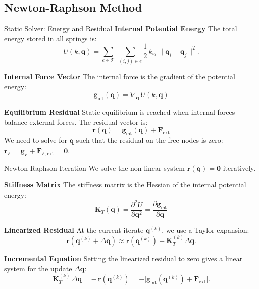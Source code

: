 \documentclass{beamer}
\begin{document}
\subsection{Newton-Raphson Method}

\begin{frame}[fragile]{Static Solver: Energy and Residual}
    \textbf{Internal Potential Energy}
    The total energy stored in all springs is:
    \[
      U(k,\mathbf{q}) = \sum_{e\in\mathcal{T}}\;\sum_{(i,j)\in e} \frac{1}{2}\,k_{ij}\,\|\mathbf{q}_i - \mathbf{q}_j\|^2.
    \]
    
    \textbf{Internal Force Vector}
    The internal force is the gradient of the potential energy:
    \[
      \mathbf{g}_{\text{int}}(\mathbf{q}) = \nabla_{\mathbf{q}} \,U(k,\mathbf{q})
    \]
    
    \textbf{Equilibrium Residual}
    Static equilibrium is reached when internal forces balance external forces. The residual vector is:
    \[
      \mathbf{r}(\mathbf{q}) = \mathbf{g}_{\text{int}}(\mathbf{q}) + \mathbf{F}_{\text{ext}}
    \]
    We need to solve for $\mathbf{q}$ such that the residual on the free nodes is zero: $\mathbf{r}_F = \mathbf{g}_F + \mathbf{F}_{F,\text{ext}} = \mathbf{0}$.
\end{frame}

\begin{frame}[fragile]{Newton-Raphson Iteration}
    We solve the non-linear system $\mathbf{r}(\mathbf{q}) = \mathbf{0}$ iteratively.
    
    \textbf{Stiffness Matrix}
    The stiffness matrix is the Hessian of the internal potential energy:
    \[
      \mathbf{K}_T(\mathbf{q}) = \frac{\partial^2 U}{\partial \mathbf{q}^2} = \frac{\partial \mathbf{g}_{\text{int}}}{\partial \mathbf{q}}
    \]
    
    \textbf{Linearized Residual}
    At the current iterate $\mathbf{q}^{(k)}$, we use a Taylor expansion:
    \[
      \mathbf{r}(\mathbf{q}^{(k)} + \Delta\mathbf{q})
      \approx
        \mathbf{r}(\mathbf{q}^{(k)})
      + \mathbf{K}_T^{(k)} \Delta\mathbf{q}.
    \]
    
    \textbf{Incremental Equation}
    Setting the linearized residual to zero gives a linear system for the update $\Delta\mathbf{q}$:
    \[
      \mathbf{K}_T^{(k)}\,\Delta\mathbf{q} = -\,\mathbf{r}(\mathbf{q}^{(k)}) = -\bigl[\mathbf{g}_{\text{int}}(\mathbf{q}^{(k)}) + \mathbf{F}_{\text{ext}}\bigr].
    \]
\end{frame}
\end{document}
